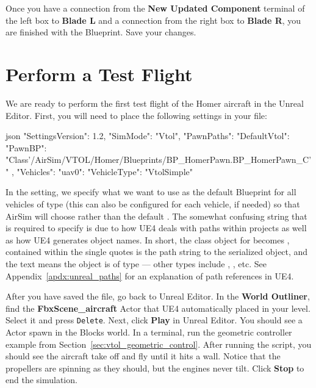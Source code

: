 Once you have a connection from the \textbf{New Updated Component} terminal of the left box to \textbf{Blade L} and a connection from the right box to \textbf{Blade R}, you are finished with the Blueprint. Save your changes.

\section{Perform a Test Flight}
We are ready to perform the first test flight of the Homer aircraft in the Unreal Editor. First, you will need to place the following settings in your  file:
\begin{minttcb}[title={AirSim Settings For Custom HomerPawn Aircraft}]{json}
{
  "SettingsVersion": 1.2,
  "SimMode": "Vtol",
  "PawnPaths": {
    "DefaultVtol": {
      "PawnBP":
        "Class'/AirSim/VTOL/Homer/Blueprints/BP_HomerPawn.BP_HomerPawn_C'"
    }
  },
  "Vehicles": {
    "uav0": {
      "VehicleType": "VtolSimple"
    }
  }
}
\end{minttcb}
In the  setting, we specify what we want to use as the default Blueprint for all vehicles of type  (this can also be configured for each vehicle, if needed) so that AirSim will choose  rather than the default . The somewhat confusing string that is required to specify  is due to how UE4 deals with paths within projects as well as how UE4 generates object names. In short, the class object for  becomes , contained within the single quotes is the path string to the serialized object, and the text  means the object is of type  --- other types include , , etc. See Appendix~\ref{apdx:unreal_paths} for an explanation of path references in UE4.

After you have saved the  file, go back to Unreal Editor. In the \textbf{World Outliner}, find the \textbf{FbxScene\_aircraft} Actor that UE4 automatically placed in your level. Select it and press \texttt{Delete}. Next, click \textbf{Play} in Unreal Editor. You should see a  Actor spawn in the Blocks world. In a terminal, run the geometric controller example from Section~\ref{sec:vtol_geometric_control}. After running the  script, you should see the aircraft take off and fly until it hits a wall. Notice that the propellers are spinning as they should, but the engines never tilt. Click \textbf{Stop} to end the simulation.

